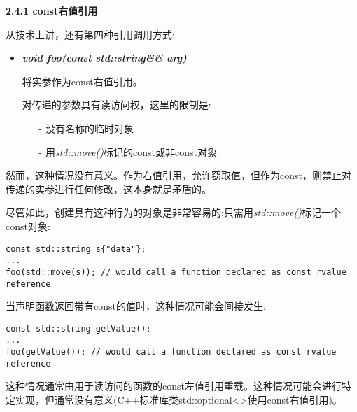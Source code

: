 \hspace*{\fill} \par %
\textbf{2.4.1 const右值引用}

从技术上讲，还有第四种引用调用方式:\par

\begin{itemize}
	\item \textit{\textbf{void foo(const std::string\&\& arg)}}\par
	将实参作为const右值引用。\par
	对传递的参数具有读访问权，这里的限制是:
	\begin{itemize}
		\item[-] 没有名称的临时对象
		\item[-] 用\textit{std::move()}标记的const或非const对象
	\end{itemize}
\end{itemize}

然而，这种情况没有意义。作为右值引用，允许窃取值，但作为const，则禁止对传递的实参进行任何修改，这本身就是矛盾的。\par

尽管如此，创建具有这种行为的对象是非常容易的:只需用\textit{std::move()}标记一个const对象:\par

\begin{lstlisting}[caption={}]
const std::string s{"data"};
...
foo(std::move(s)); // would call a function declared as const rvalue reference
\end{lstlisting}

当声明函数返回带有const的值时，这种情况可能会间接发生:\par

\begin{lstlisting}[caption={}]
const std::string getValue();
...
foo(getValue()); // would call a function declared as const rvalue reference
\end{lstlisting}

这种情况通常由用于读访问的函数的const左值引用重载。这种情况可能会进行特定实现，但通常没有意义(C++标准库类std::optional<>使用const右值引用)。\par




















































